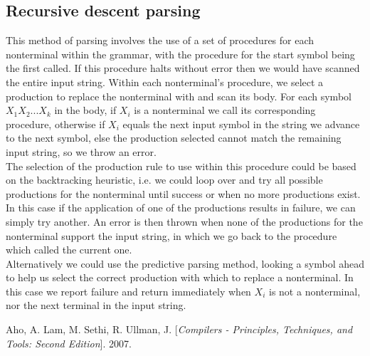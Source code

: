 \documentclass[a4paper, 11pt]{article}
\begin{document}
\subsection{Recursive descent parsing}
This method of parsing involves the use of a set of procedures for each nonterminal within the grammar, with the procedure for the start symbol being the first called. If this procedure halts without error then we would have scanned the entire input string. Within each nonterminal's procedure, we select a production to replace the nonterminal with and scan its body. For each symbol $X_1X_2...X_k$ in the body, if $X_i$ is a nonterminal we call its corresponding procedure, otherwise if $X_i$ equals the next input symbol in the string we advance to the next symbol, else the production selected cannot match the remaining input string, so we throw an error.
\\\newline
The selection of the production rule to use within this procedure could be based on the backtracking heuristic, i.e. we could loop over and try all possible productions for the nonterminal until success or when no more productions exist. In this case if the application of one of the productions results in failure, we can simply try another. An error is then thrown when none of the productions for the nonterminal support the input string, in which we go back to the procedure which called the current one.
\\\newline
Alternatively we could use the predictive parsing method, looking a symbol ahead to help us select the correct production with which to replace a nonterminal. In this case we report failure and return immediately when $X_i$ is not a nonterminal, nor the next terminal in the input string.

\newpage
{}
\begin{thebibliography}{9}

Aho, A. Lam, M. Sethi, R. Ullman, J.
[\textit{Compilers - Principles, Techniques, and Tools: Second Edition}]. 
2007.


\end{thebibliography}
\end{document}
